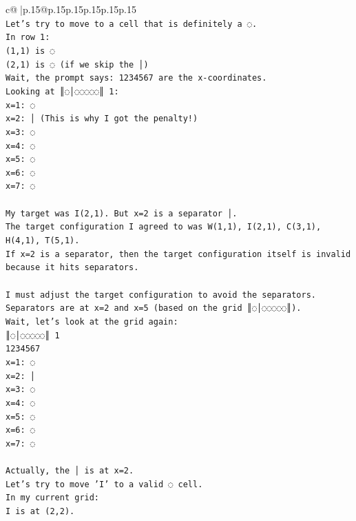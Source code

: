 \documentclass{article}
\begin{document}
{\begin{supertabular}{c@{$\;$}|p{.15\linewidth}@{}p{.15\linewidth}p{.15\linewidth}p{.15\linewidth}p{.15\linewidth}p{.15\linewidth}}
{{{\\ 
\texttt{Let's try to move to a cell that is definitely a ◌.} \\
\texttt{In row 1:} \\
\texttt{(1,1) is ◌} \\
\texttt{(2,1) is ◌ (if we skip the │)} \\
\texttt{Wait, the prompt says: 1234567 are the x{-}coordinates.} \\
\texttt{Looking at ║◌│◌◌◌◌◌║ 1:} \\
\texttt{x=1: ◌} \\
\texttt{x=2: │ (This is why I got the penalty!)} \\
\texttt{x=3: ◌} \\
\texttt{x=4: ◌} \\
\texttt{x=5: ◌} \\
\texttt{x=6: ◌} \\
\texttt{x=7: ◌} \\
\\ 
\texttt{My target was I(2,1). But x=2 is a separator │.} \\
\texttt{The target configuration I agreed to was W(1,1), I(2,1), C(3,1), H(4,1), T(5,1).} \\
\texttt{If x=2 is a separator, then the target configuration itself is invalid because it hits separators.} \\
\\ 
\texttt{I must adjust the target configuration to avoid the separators.} \\
\texttt{Separators are at x=2 and x=5 (based on the grid ║◌│◌◌◌◌◌║).} \\
\texttt{Wait, let's look at the grid again:} \\
\texttt{║◌│◌◌◌◌◌║ 1} \\
\texttt{1234567} \\
\texttt{x=1: ◌} \\
\texttt{x=2: │} \\
\texttt{x=3: ◌} \\
\texttt{x=4: ◌} \\
\texttt{x=5: ◌} \\
\texttt{x=6: ◌} \\
\texttt{x=7: ◌} \\
\\ 
\texttt{Actually, the │ is at x=2.} \\
\texttt{Let's try to move 'I' to a valid ◌ cell.} \\
\texttt{In my current grid:} \\
\texttt{I is at (2,2).} \\
}}}
\end{supertabular}}
\end{document}
